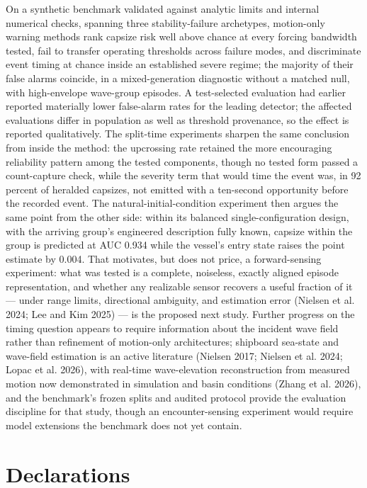 \documentclass[11pt]{article}
\begin{document}
On a synthetic benchmark validated against analytic limits and internal numerical checks,
spanning three stability-failure archetypes, motion-only warning methods rank capsize risk well
above chance at every forcing bandwidth tested, fail to
transfer operating thresholds across failure modes, and discriminate event timing at chance
inside an established severe regime; the majority of their false alarms coincide, in a
mixed-generation diagnostic without a matched null, with high-envelope wave-group episodes. A
test-selected evaluation had earlier reported materially lower false-alarm rates for the
leading detector; the affected evaluations differ in population as well as threshold
provenance, so the effect is reported qualitatively. The split-time experiments
sharpen the same conclusion from inside the method: the upcrossing rate retained the more
encouraging reliability pattern among the tested components, though no tested form passed a
count-capture check, while the severity term that would time the event was, in 92
percent of heralded capsizes, not emitted with a ten-second opportunity before the recorded
event. The natural-initial-condition experiment then
argues the same point from the other side: within its balanced single-configuration design,
with the arriving group's engineered description fully known, capsize within the group is
predicted at AUC 0.934 while the vessel's entry state raises the point estimate by 0.004. That motivates, but does not
price, a forward-sensing experiment: what was tested is a complete, noiseless, exactly aligned
episode representation, and whether any realizable sensor recovers a useful fraction of it ---
under range limits, directional ambiguity, and estimation error (Nielsen et al. 2024; Lee and
Kim 2025) --- is the proposed next study. Further progress on the timing
question appears to require information about the incident wave field rather than refinement of
motion-only architectures; shipboard sea-state and wave-field estimation is an active
literature (Nielsen 2017; Nielsen et al. 2024; Lopac et al. 2026), with real-time wave-elevation
reconstruction from measured motion now demonstrated in simulation and basin conditions
(Zhang et al. 2026), and the benchmark's frozen
splits and audited protocol provide the evaluation discipline for that study, though an
encounter-sensing experiment would require model extensions the benchmark does not yet
contain.

\section*{Declarations}
\end{document}
